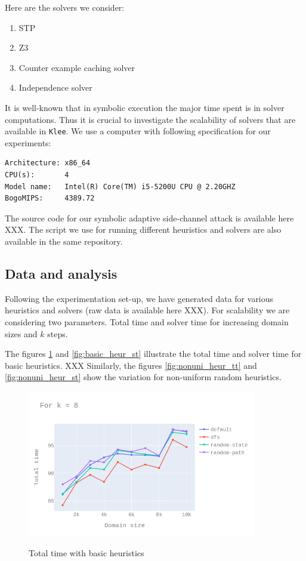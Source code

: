 \documentclass[11pt,a4paper,notitlepage]{article}
\begin{document}
Here are the solvers we consider:
\begin{enumerate}
\item STP
\item Z3
\item Counter example  caching solver
\item Independence solver
\end{enumerate}

It is well-known that in symbolic execution the major time spent is in solver computations. Thus it is crucial to investigate the scalability of solvers that are available in \texttt{Klee}.
We use a computer with following specification for our experiments:
\begin{verbatim}
Architecture: x86_64
CPU(s):       4
Model name:   Intel(R) Core(TM) i5-5200U CPU @ 2.20GHZ
BogoMIPS:     4389.72
\end{verbatim}

The source code for our symbolic adaptive side-channel attack is available here XXX.
The script we use for running different heuristics and solvers are also available in the same repository.

\subsection{Data and analysis}
\label{subsec:dataandanalysis}

Following the experimentation set-up, we have generated data for various heuristics and solvers (raw data is available here XXX).
For scalability we are considering two parameters. Total time and solver time for increasing domain sizes and $k$ steps.

The figures \ref{fig:basic_heur_tt} and \ref{fig:basic_heur_st} illustrate the total time and solver time for basic heuristics. XXX
Similarly, the figures \ref{fig:nonuni_heur_tt} and \ref{fig:nonuni_heur_st} show the variation for non-uniform random heuristics.

\begin{figure}[h]
\centering
\includegraphics[width=10cm]{k_8_tt_basic_heur.png}
\label{fig:basic_heur_tt}
\caption{Total time with basic heuristics}
\centering
\end{figure}
\end{document}
